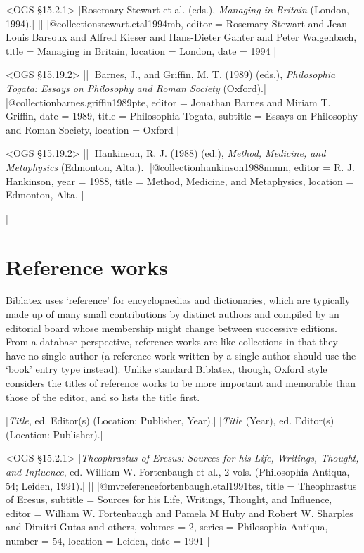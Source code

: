 \documentclass[extrafontsizes,11pt,a4paper,oneside]{memoir}
\newcommand*{\lit}[1]{\textsf{#1}}
\newcommand*{\code}[1]{`\textsf{#1}'}
\begin{document}
\bibexample<OGS \S15.2.1>
|Rosemary Stewart et al. (eds.), \emph{Managing in Britain} (London, 1994).|%
||%
|@collection{stewart.etal1994mb,
  editor = {Rosemary Stewart and Jean-Louis Barsoux and Alfred Kieser and Hans-Dieter Ganter and Peter Walgenbach},
  title = {Managing in {Britain}},
  location = {London},
  date = {1994}
}|

\bibexample<OGS \S15.19.2>
||%
|Barnes, J., and Griffin, M. T. (1989) (eds.), \emph{Philosophia Togata: Essays on Philosophy and Roman Society} (Oxford).|%
|@collection{barnes.griffin1989pte,
  editor = {Jonathan Barnes and Miriam T. Griffin},
  date = {1989},
  title = {Philosophia Togata},
  subtitle = {Essays on Philosophy and Roman Society},
  location = {Oxford}
}|%

\bibexample<OGS \S15.19.2>
||%
|Hankinson, R. J. (1988) (ed.), \emph{Method, Medicine, and Metaphysics} (Edmonton, Alta.).|%
|@collection{hankinson1988mmm,
  editor = {R. J. Hankinson},
  year = {1988},
  title = {Method, Medicine, and Metaphysics},
  location = {Edmonton, Alta.}
}|

\todoc|
\section{Reference works}

Biblatex uses \code{reference} for encyclopaedias and dictionaries, which are typically made up of many small contributions by distinct authors and compiled by an editorial board whose membership might change between successive editions. From a database perspective, reference works are like collections in that they have no single author (a reference work written by a single author should use the \code{book} entry type instead). Unlike standard Biblatex, though, Oxford style considers the titles of reference works to be more important and memorable than those of the editor, and so lists the title first.
|

\specs
|\emph{Title}, \lit{ed.} Editor(s) (Location: Publisher, Year).|%
|\emph{Title} (Year), \lit{ed.} Editor(s) (Location: Publisher).|

\bibexample<OGS \S15.2.1>
|\emph{Theophrastus of Eresus: Sources for his Life, Writings, Thought, and Influence}, ed. William W. Fortenbaugh et al., 2 vols. (Philosophia Antiqua, 54; Leiden, 1991).|%
||%
|@mvreference{fortenbaugh.etal1991tes,
  title = {{Theophrastus} of {Eresus}},
  subtitle = {Sources for his Life, Writings, Thought, and Influence},
  editor = {William W. Fortenbaugh and Pamela M Huby and Robert W. Sharples and Dimitri Gutas and others},
  volumes = {2},
  series = {Philosophia Antiqua},
  number = {54},
  location = {Leiden},
  date = {1991}
}|
\end{document}
